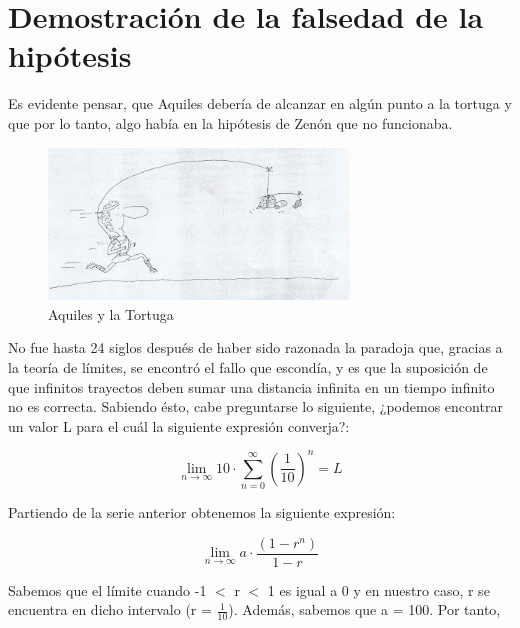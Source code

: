 \documentclass[a4paper,12pt]{article}
\begin{document}
   \section{Demostración de la falsedad de la hipótesis}
   
   Es evidente pensar, que Aquiles debería de alcanzar en algún punto 
   a la tortuga y que por lo tanto, algo había
   en la hipótesis de Zenón que no funcionaba. 
   
   \begin{figure}[h]
   \begin{center}
   \includegraphics[width=8cm]{Imagenes/aquiles-tortuga.jpg}
   \end{center}
   \caption{Aquiles y la Tortuga}
   \label{fig:aquiles1}
   \end{figure} 
    
   \newpage
   
   No fue hasta 24 siglos después de haber sido razonada la paradoja que, 
   gracias a la teoría de límites, se encontró el fallo que escondía,
   y es que la suposición de que infinitos trayectos deben sumar una distancia infinita en 
   un tiempo infinito no es correcta. Sabiendo ésto, cabe preguntarse lo siguiente,      
   ¿podemos encontrar un valor L para el cuál la siguiente expresión converja?: 
   
   \begin{equation}
   \lim\limits_{n \rightarrow \infty} 10 \cdot \sum_{n=0}^\infty (\frac{1}{10})^n = L
   \end{equation}   
   
   Partiendo de la serie anterior obtenemos la siguiente expresión:
   
   \begin{equation}
   \lim\limits_{n \rightarrow \infty} a \cdot \frac{(1 - r^n)}{1 - r}
   \end{equation}
   
   Sabemos que el límite cuando -1 $<$ r $<$ 1 es igual a 0 y en nuestro caso, r se encuentra en
   dicho intervalo (r = $\frac{1}{10}$). Además, sabemos que a = 100. Por tanto, 
   
\end{document}
